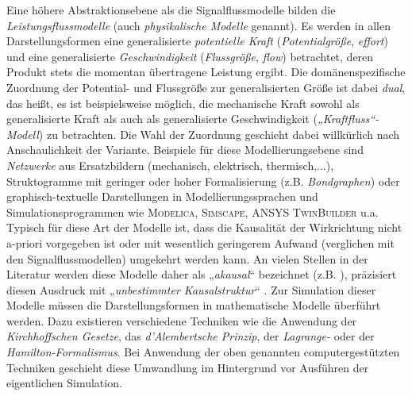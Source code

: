 Eine höhere Abstraktionsebene als die Signalflussmodelle bilden die \emph{Leistungsflussmodelle} (auch \emph{physikalische Modelle} genannt). Es werden in allen Darstellungsformen eine generalisierte \emph{potentielle Kraft} (\emph{Potentialgröße}, \emph{effort}) und eine generalisierte \emph{Geschwindigkeit} (\emph{Flussgröße}, \emph{flow}) betrachtet, deren Produkt stets die momentan übertragene Leistung ergibt. Die domänenspezifische Zuordnung der Potential- und Flussgröße zur generalisierten Größe ist dabei \emph{dual}, das heißt, es ist beispielsweise möglich, die mechanische Kraft sowohl als generalisierte Kraft als auch als generalisierte Geschwindigkeit (\emph{„Kraftfluss“-Modell}) zu betrachten. Die Wahl der Zuordnung geschieht dabei willkürlich nach Anschaulichkeit der Variante. Beispiele für diese Modellierungsebene sind \emph{Netzwerke} aus Ersatzbildern (mechanisch, elektrisch, thermisch,...), Struktogramme mit geringer oder hoher Formalisierung (z.B. \emph{Bondgraphen}) oder graphisch-textuelle Darstellungen in Modellierungssprachen und Simulationsprogrammen wie \textsc{Modelica}, \textsc{Simscape}, \textsc{ANSYS TwinBuilder} u.a. Typisch für diese Art der Modelle ist, dass die Kausalität der Wirkrichtung nicht a-priori vorgegeben ist oder mit wesentlich geringerem Aufwand (verglichen mit den Signalflussmodellen) umgekehrt werden kann. An vielen Stellen in der Literatur werden diese Modelle daher als „\emph{akausal}“ bezeichnet (z.B.  \cites{gesenhuesObjektorientiertmodellbasierteCharakterisierungUberwachung2019,schmittMethodenZurModellbildung2019,richterEinsatzVirtuellerPrototypen2013}), \citeauthor{janschekSystementwurfMechatronischerSysteme2010} präzisiert diesen Ausdruck mit „\emph{unbestimmter Kausalstruktur}“ \cite[S.~118]{janschekSystementwurfMechatronischerSysteme2010}. Zur Simulation dieser Modelle müssen die Darstellungsformen in mathematische Modelle überführt werden. Dazu existieren verschiedene Techniken wie die Anwendung der \emph{Kirchhoffschen Gesetze}, das \emph{d’Alembertsche Prinzip}, der \emph{Lagrange-} oder der \emph{Hamilton-Formalismus}. Bei Anwendung der oben genannten computergestützten Techniken geschieht diese Umwandlung im Hintergrund vor Ausführen der eigentlichen Simulation. 

